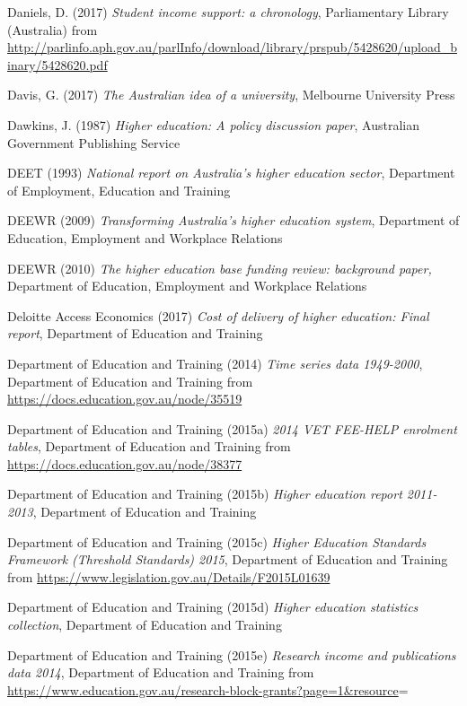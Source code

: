 \documentclass[]{book}
\begin{document}
Daniels, D. (2017) \emph{Student income support: a chronology}, Parliamentary Library (Australia) from \url{http://parlinfo.aph.gov.au/parlInfo/download/library/prspub/5428620/upload_binary/5428620.pdf}

Davis, G. (2017) \emph{The Australian idea of a university}, Melbourne University Press

Dawkins, J. (1987) \emph{Higher education: A policy discussion paper}, Australian Government Publishing Service

\protect\hypertarget{_ENREF_56}{}{}DEET (1993) \emph{National report on Australia's higher education sector}, Department of Employment, Education and Training

DEEWR (2009) \emph{Transforming Australia's higher education system}, Department of Education, Employment and Workplace Relations

DEEWR (2010) \emph{The higher education base funding review: background paper,} Department of Education, Employment and Workplace Relations

Deloitte Access Economics (2017) \emph{Cost of delivery of higher education: Final report}, Department of Education and Training

\protect\hypertarget{_ENREF_60}{}{}Department of Education and Training (2014) \emph{Time series data 1949-2000}, Department of Education and Training from \url{https://docs.education.gov.au/node/35519}

\protect\hypertarget{_ENREF_61}{}{}Department of Education and Training (2015a) \emph{2014 VET FEE-HELP enrolment tables}, Department of Education and Training from \url{https://docs.education.gov.au/node/38377}

\protect\hypertarget{_ENREF_62}{}{}Department of Education and Training (2015b) \emph{Higher education report 2011-2013}, Department of Education and Training

Department of Education and Training (2015c) \emph{Higher Education Standards Framework (Threshold Standards) 2015}, Department of Education and Training from \url{https://www.legislation.gov.au/Details/F2015L01639}

Department of Education and Training (2015d) \emph{Higher education statistics collection}, Department of Education and Training

Department of Education and Training (2015e) \emph{Research income and publications data 2014}, Department of Education and Training from \url{https://www.education.gov.au/research-block-grants?page=1\&resource}=
\end{document}
